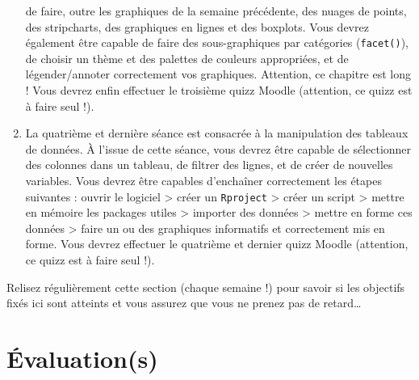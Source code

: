 \documentclass[
  a4paper,
  DIV=11,
  numbers=noendperiod,
  oneside]{scrreprt}
\begin{document}
\begin{enumerate}
  de faire, outre les graphiques de la semaine précédente, des nuages de
  points, des stripcharts, des graphiques en lignes et des boxplots.
  Vous devrez également être capable de faire des sous-graphiques par
  catégories (\texttt{facet()}), de choisir un thème et des palettes de
  couleurs appropriées, et de légender/annoter correctement vos
  graphiques. Attention, ce chapitre est long ! Vous devrez enfin
  effectuer le troisième quizz Moodle (attention, ce quizz est à faire
  seul !).
\item
  La quatrième et dernière séance est consacrée à la manipulation des
  tableaux de données. À l'issue de cette séance, vous devrez être
  capable de sélectionner des colonnes dans un tableau, de filtrer des
  lignes, et de créer de nouvelles variables. Vous devrez être capables
  d'enchaîner correctement les étapes suivantes : ouvrir le logiciel
  \textgreater{} créer un \texttt{Rproject} \textgreater{} créer un
  script \textgreater{} mettre en mémoire les packages utiles
  \textgreater{} importer des données \textgreater{} mettre en forme ces
  données \textgreater{} faire un ou des graphiques informatifs et
  correctement mis en forme. Vous devrez effectuer le quatrième et
  dernier quizz Moodle (attention, ce quizz est à faire seul !).
\end{enumerate}

\begin{tcolorbox}[enhanced jigsaw, colbacktitle=quarto-callout-warning-color!10!white, left=2mm, leftrule=.75mm, titlerule=0mm, bottomtitle=1mm, colback=white, breakable, arc=.35mm, bottomrule=.15mm, toprule=.15mm, toptitle=1mm, opacitybacktitle=0.6, title=\textcolor{quarto-callout-warning-color}{\faExclamationTriangle}\hspace{0.5em}{Attention au retard}, coltitle=black, rightrule=.15mm, opacityback=0, colframe=quarto-callout-warning-color-frame]

Relisez régulièrement cette section (chaque semaine !) pour savoir si
les objectifs fixés ici sont atteints et vous assurez que vous ne prenez
pas de retard\ldots{}

\end{tcolorbox}

\section*{Évaluation(s)}\label{uxe9valuations}

\end{document}
